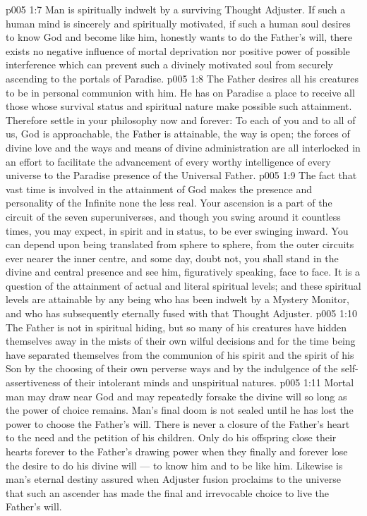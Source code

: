 \vs p005 1:7 Man is spiritually indwelt by a surviving Thought Adjuster. If such a human mind is sincerely and spiritually motivated, if such a human soul desires to know God and become like him, honestly wants to do the Father’s will, there exists no negative influence of mortal deprivation nor positive power of possible interference which can prevent such a divinely motivated soul from securely ascending to the portals of Paradise.
\vs p005 1:8 The Father desires all his creatures to be in personal communion with him. He has on Paradise a place to receive all those whose survival status and spiritual nature make possible such attainment. Therefore settle in your philosophy now and forever: To each of you and to all of us, God is approachable, the Father is attainable, the way is open; the forces of divine love and the ways and means of divine administration are all interlocked in an effort to facilitate the advancement of every worthy intelligence of every universe to the Paradise presence of the Universal Father.
\vs p005 1:9 The fact that vast time is involved in the attainment of God makes the presence and personality of the Infinite none the less real. Your ascension is a part of the circuit of the seven superuniverses, and though you swing around it countless times, you may expect, in spirit and in status, to be ever swinging inward. You can depend upon being translated from sphere to sphere, from the outer circuits ever nearer the inner centre, and some day, doubt not, you shall stand in the divine and central presence and see him, figuratively speaking, face to face. It is a question of the attainment of actual and literal spiritual levels; and these spiritual levels are attainable by any being who has been indwelt by a Mystery Monitor, and who has subsequently eternally fused with that Thought Adjuster.
\vs p005 1:10 \pc The Father is not in spiritual hiding, but so many of his creatures have hidden themselves away in the mists of their own wilful decisions and for the time being have separated themselves from the communion of his spirit and the spirit of his Son by the choosing of their own perverse ways and by the indulgence of the self\hyp{}assertiveness of their intolerant minds and unspiritual natures.
\vs p005 1:11 Mortal man may draw near God and may repeatedly forsake the divine will so long as the power of choice remains. Man’s final doom is not sealed until he has lost the power to choose the Father’s will. There is never a closure of the Father’s heart to the need and the petition of his children. Only do his offspring close their hearts forever to the Father’s drawing power when they finally and forever lose the desire to do his divine will --- to know him and to be like him. Likewise is man’s eternal destiny assured when Adjuster fusion proclaims to the universe that such an ascender has made the final and irrevocable choice to live the Father’s will.
